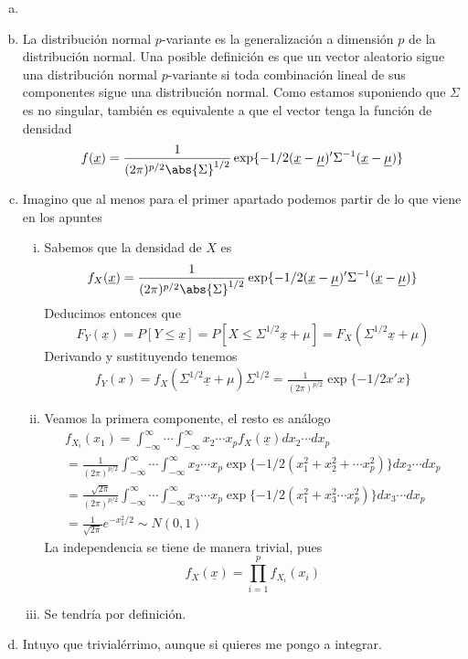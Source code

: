 \documentclass[twoside]{article}
\newcommand{\muestra}[1]{{\underline{#1}}}
\begin{document}
\begin{solucion}
\begin{enumerate}[(a)]
\item[]
\item La distribución normal $p$-variante es la generalización a dimensión $p$ de la distribución normal. Una posible definición es que un vector aleatorio sigue una distribución normal $p$-variante si toda combinación lineal de sus componentes sigue una distribución normal. Como estamos suponiendo que $\Sigma$ es no singular, también es equivalente a que el vector tenga la función de densidad
$$
f(\muestra{x})=\frac{1}{(2\pi)^{p/2}\abs{\Sigma}^{1/2}}\exp\{-1/2(\muestra{x}-\muestra{\mu})'\Sigma^{-1}(\muestra{x}-\muestra{\mu})\}
$$
\item Imagino que al menos para el primer apartado podemos partir de lo que viene en los apuntes
\begin{enumerate}[i.]
\item Sabemos que la densidad de $X$ es
$$
f_X(\muestra{x})=\frac{1}{(2\pi)^{p/2}\abs{\Sigma}^{1/2}}\exp\{-1/2(\muestra{x}-\muestra{\mu})'\Sigma^{-1}(\muestra{x}-\muestra{\mu})\}
$$
Deducimos entonces que
$$
F_Y(\muestra{x})=P[Y\leq \muestra{x}]= P[X\leq \Sigma^{1/2}\muestra x+\mu] = F_X( \Sigma^{1/2}\muestra x+\mu)
$$
Derivando y sustituyendo tenemos
\begin{gather*}
f_Y(x)=f_X(\Sigma^{1/2}\muestra x+\mu)\Sigma^{1/2} = \frac{1}{(2\pi)^{p/2}}\exp\{-1/2x'x\}
\end{gather*}
\item Veamos la primera componente, el resto es análogo
\begin{gather*}
f_{X_i}(x_1)=\int_{-\infty}^\infty \cdots \int_{-\infty}^\infty x_2\cdots x_p f_X(\muestra{x})dx_2\cdots dx_p\\
= \frac{1}{(2\pi)^{p/2}}\int_{-\infty}^\infty \cdots \int_{-\infty}^\infty x_2\cdots x_p\exp\{-1/2(x_1^2+x_2^2+\cdots x_p^2)\}dx_2\cdots dx_p \\
= \frac{\sqrt{2\pi}}{(2\pi)^{p/2}}\int_{-\infty}^\infty \cdots \int_{-\infty}^\infty x_3\cdots x_p\exp\{-1/2(x_1^2+x_3^2\cdots x_p^2)\}dx_3\cdots dx_p \\
= \frac{1}{\sqrt{2\pi}}e^{-x_1^2/2} \sim N(0,1)
\end{gather*}
La independencia se tiene de manera trivial, pues
$$
f_X(\muestra{x})=\prod_{i=1}^p f_{X_i}(x_i)
$$
\item Se tendría por definición.
\end{enumerate}
\item Intuyo que trivialérrimo, aunque si quieres me pongo a integrar.

\end{enumerate}
\end{solucion}
\end{document}
